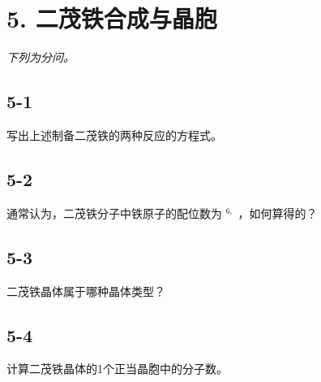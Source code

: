 \section*{5. 二茂铁合成与晶胞}
\textit{下列为分问。}

\subsection*{5-1}
写出上述制备⼆茂铁的两种反应的⽅程式。

\subsection*{5-2}
通常认为，⼆茂铁分⼦中铁原⼦的配位数为 $^ { 6 , }$ ，如何算得的？

\subsection*{5-3}
⼆茂铁晶体属于哪种晶体类型？

\subsection*{5-4}
计算⼆茂铁晶体的1个正当晶胞中的分⼦数。
